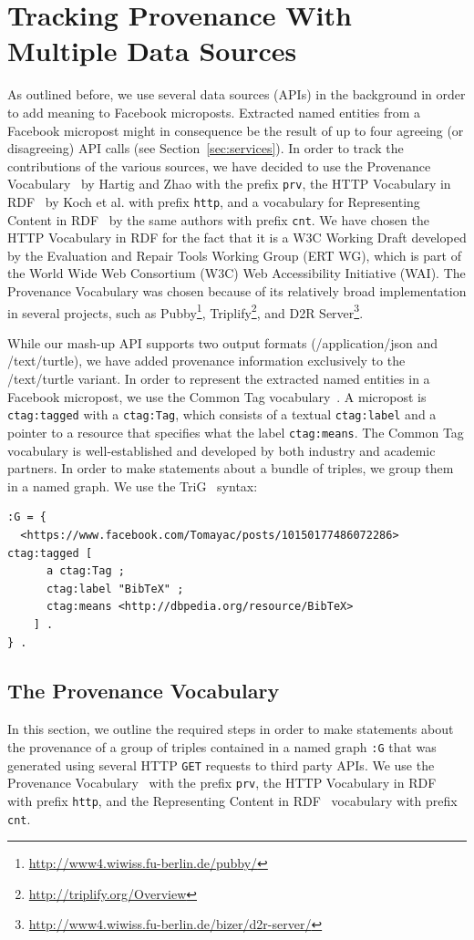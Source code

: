 \documentclass[conference]{IEEEtran}
\begin{document}
\section{Tracking Provenance With Multiple Data Sources}                    \label{sec:tracking}
As outlined before, we use several data sources (APIs) in the background in order to add meaning to Facebook microposts. Extracted named entities from a Facebook micropost might in consequence be the result of up to four agreeing (or disagreeing) API calls (see Section~\ref{sec:services}). In order to track the contributions of the various sources, we have decided to use the Provenance Vocabulary~\cite{Hartig:Provenance} by Hartig and Zhao with the prefix \texttt{prv}, the HTTP Vocabulary in RDF~\cite{HTTP:RDF} by Koch et al. with prefix \texttt{http}, and a vocabulary for Representing Content in RDF~\cite{CNT:RDF} by the same authors with prefix \texttt{cnt}. We have chosen the HTTP Vocabulary in RDF for the fact that it is a W3C Working Draft  developed by the Evaluation and Repair Tools Working Group (ERT WG), which is part of the World Wide Web Consortium (W3C) Web Accessibility Initiative (WAI). The Provenance Vocabulary was chosen because of its relatively broad implementation in several projects, such as Pubby\footnote{\url{http://www4.wiwiss.fu-berlin.de/pubby/}}, Triplify\footnote{\url{http://triplify.org/Overview}}, and D2R Server\footnote{\url{http://www4.wiwiss.fu-berlin.de/bizer/d2r-server/}}.

While our mash-up API supports two output formats (/application/json and /text/turtle), we have added provenance information exclusively to the /text/turtle variant. In order to represent the extracted named entities in a Facebook micropost, we use the Common Tag vocabulary~\cite{CommonTag:Spec}. A micropost is \texttt{ctag:tagged} with a \texttt{ctag:Tag}, which consists of a textual \texttt{ctag:label} and a pointer to a resource that specifies what the label \texttt{ctag:means}. The Common Tag vocabulary is well-established and developed by both industry and academic partners. In order to make statements about a bundle of triples, we group them in a named graph. We use the TriG~\cite{Bizer:TriG} syntax:
\begin{lstlisting}
:G = {
  <https://www.facebook.com/Tomayac/posts/10150177486072286> ctag:tagged [
      a ctag:Tag ;
      ctag:label "BibTeX" ;
      ctag:means <http://dbpedia.org/resource/BibTeX>
    ] .
} .
\end{lstlisting}

\subsection{The Provenance Vocabulary}                                      \label{sec:provenance}
In this section, we outline the required steps in order to make statements about the provenance of a group of triples contained in a named graph \texttt{:G} that was generated using several HTTP \texttt{GET} requests to third party APIs. We use the Provenance Vocabulary~\cite{Hartig:Provenance} with the prefix \texttt{prv}, the HTTP Vocabulary in RDF~\cite{HTTP:RDF} with prefix \texttt{http}, and the Representing Content in RDF~\cite{CNT:RDF} vocabulary with prefix \texttt{cnt}.
\end{document}
